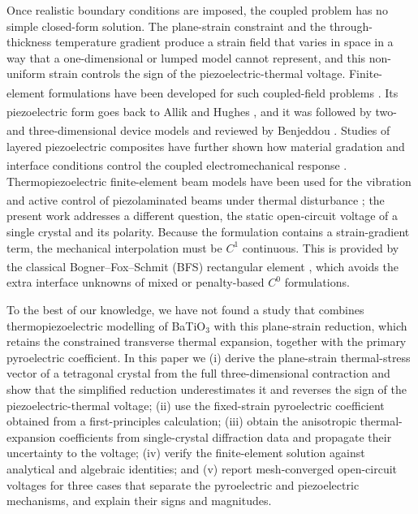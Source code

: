\documentclass[a4paper, 11pt, twoside]{article}
\newcommand{\supercite}[1]{\!\!\textsuperscript{\cite{#1}}}
\begin{document}
Once realistic boundary conditions are imposed, the coupled problem has no simple
closed-form solution. The plane-strain constraint and the through-thickness temperature
gradient produce a strain field that varies in space in a way that a one-dimensional or
lumped model cannot represent, and this non-uniform strain controls the sign of the
piezoelectric-thermal voltage. Finite-element formulations have been developed for such
coupled-field problems \supercite{ZienkiewiczTaylor2005,Hughes2000,Belytschko2000,Bathe1996}.
Its piezoelectric form goes back to Allik and Hughes \supercite{AllikHughes1970}, and it was
followed by two- and three-dimensional device models \supercite{Lerch1990,Tzou1993} and
reviewed by Benjeddou \supercite{Benjeddou2000a}. Studies of layered piezoelectric
composites have further shown how material gradation and interface conditions control
the coupled electromechanical response \supercite{Gupta2025CS}. Thermopiezoelectric finite-element beam
models have been used for the vibration and active control of piezolaminated beams
under thermal disturbance \supercite{Sanbi2014ThermoPyroBeam}; the present work addresses a
different question, the static open-circuit voltage of a single crystal and its
polarity. Because the formulation contains a strain-gradient term, the mechanical
interpolation must be $C^1$ continuous. This is provided by the classical
Bogner--Fox--Schmit (BFS) rectangular element \supercite{Bogner1965}, which avoids the extra
interface unknowns of mixed or penalty-based $C^0$ formulations.

To the best of our knowledge, we have not found a study that combines
thermopiezoelectric modelling of BaTiO$_3$ with this plane-strain reduction,
which retains the constrained transverse thermal expansion, together with the
primary pyroelectric coefficient. In this paper we (i) derive the plane-strain thermal-stress
vector of a tetragonal crystal from the full three-dimensional contraction and show that
the simplified reduction underestimates it and reverses the sign of the
piezoelectric-thermal voltage; (ii) use the fixed-strain pyroelectric coefficient
obtained from a first-principles calculation; (iii) obtain the anisotropic
thermal-expansion coefficients from single-crystal diffraction data and propagate their
uncertainty to the voltage; (iv) verify the finite-element solution against analytical
and algebraic identities; and (v) report mesh-converged open-circuit voltages for three
cases that separate the pyroelectric and piezoelectric mechanisms, and explain their
signs and magnitudes.
\end{document}
